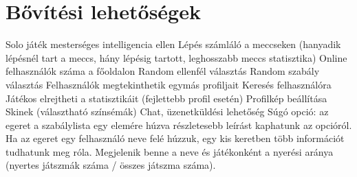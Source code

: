 \chapter{Bővítési lehetőségek}

Solo játék mesterséges intelligencia ellen
Lépés számláló a meccseken (hanyadik lépésnél tart a meccs, hány lépésig tartott, leghosszabb meccs statisztika)
Online felhasználók száma a főoldalon
Random ellenfél választás
Random szabály választás
Felhasználók megtekinthetik egymás profiljait
Keresés felhasználóra
Játékos elrejtheti a statisztikáit (fejlettebb profil esetén)
Profilkép beállítása
Skinek (választható színsémák)
Chat, üzenetküldési lehetőség
Súgó opció: az egeret a szabálylista egy elemére húzva részletesebb leírást kaphatunk az opcióról. Ha az egeret egy felhasználó neve felé húzzuk, egy kis keretben több információt tudhatunk meg róla. Megjelenik benne a neve és játékonként a nyerési aránya (nyertes játszmák száma / összes játszma száma).
